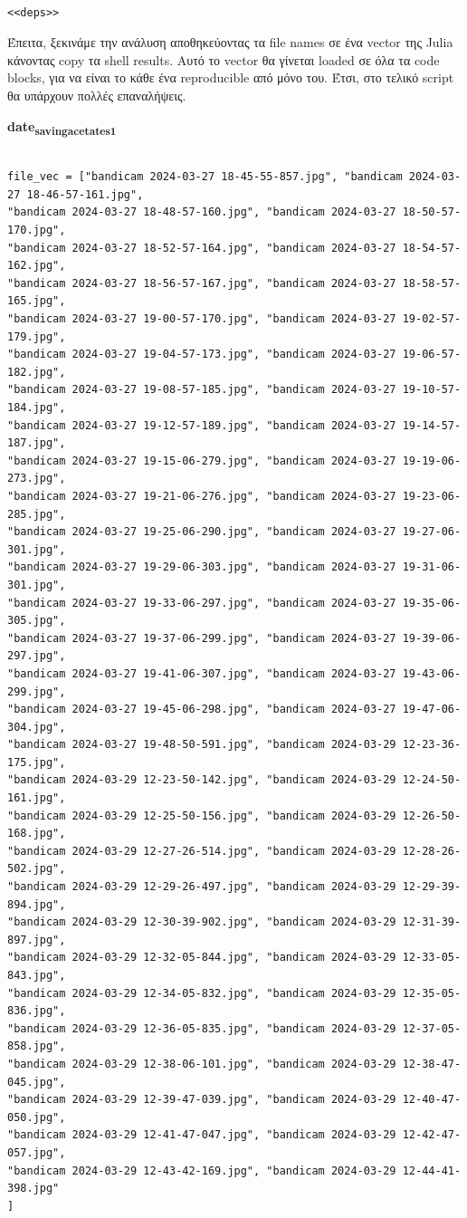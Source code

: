 \documentclass[11pt]{article}
\begin{document}
\begin{verbatim}

<<deps>>

\end{verbatim}

Έπειτα, ξεκινάμε την ανάλυση αποθηκεύοντας τα file names σε ένα vector της Julia κάνοντας copy τα shell results. Αυτό το vector θα γίνεται loaded σε όλα τα code blocks, για να είναι το κάθε ένα reproducible από μόνο του. Έτσι, στο τελικό script θα υπάρχουν πολλές επαναλήψεις.

\textbf{date\textsubscript{saving}\textsubscript{acetate}\textsubscript{s1}}
\begin{verbatim}

file_vec = ["bandicam 2024-03-27 18-45-55-857.jpg", "bandicam 2024-03-27 18-46-57-161.jpg",
"bandicam 2024-03-27 18-48-57-160.jpg", "bandicam 2024-03-27 18-50-57-170.jpg",
"bandicam 2024-03-27 18-52-57-164.jpg", "bandicam 2024-03-27 18-54-57-162.jpg",
"bandicam 2024-03-27 18-56-57-167.jpg", "bandicam 2024-03-27 18-58-57-165.jpg",
"bandicam 2024-03-27 19-00-57-170.jpg", "bandicam 2024-03-27 19-02-57-179.jpg",
"bandicam 2024-03-27 19-04-57-173.jpg", "bandicam 2024-03-27 19-06-57-182.jpg",
"bandicam 2024-03-27 19-08-57-185.jpg", "bandicam 2024-03-27 19-10-57-184.jpg",
"bandicam 2024-03-27 19-12-57-189.jpg", "bandicam 2024-03-27 19-14-57-187.jpg",
"bandicam 2024-03-27 19-15-06-279.jpg", "bandicam 2024-03-27 19-19-06-273.jpg",
"bandicam 2024-03-27 19-21-06-276.jpg", "bandicam 2024-03-27 19-23-06-285.jpg",
"bandicam 2024-03-27 19-25-06-290.jpg", "bandicam 2024-03-27 19-27-06-301.jpg",
"bandicam 2024-03-27 19-29-06-303.jpg", "bandicam 2024-03-27 19-31-06-301.jpg",
"bandicam 2024-03-27 19-33-06-297.jpg", "bandicam 2024-03-27 19-35-06-305.jpg",
"bandicam 2024-03-27 19-37-06-299.jpg", "bandicam 2024-03-27 19-39-06-297.jpg",
"bandicam 2024-03-27 19-41-06-307.jpg", "bandicam 2024-03-27 19-43-06-299.jpg",
"bandicam 2024-03-27 19-45-06-298.jpg", "bandicam 2024-03-27 19-47-06-304.jpg",
"bandicam 2024-03-27 19-48-50-591.jpg", "bandicam 2024-03-29 12-23-36-175.jpg",
"bandicam 2024-03-29 12-23-50-142.jpg", "bandicam 2024-03-29 12-24-50-161.jpg",
"bandicam 2024-03-29 12-25-50-156.jpg", "bandicam 2024-03-29 12-26-50-168.jpg",
"bandicam 2024-03-29 12-27-26-514.jpg", "bandicam 2024-03-29 12-28-26-502.jpg",
"bandicam 2024-03-29 12-29-26-497.jpg", "bandicam 2024-03-29 12-29-39-894.jpg",
"bandicam 2024-03-29 12-30-39-902.jpg", "bandicam 2024-03-29 12-31-39-897.jpg",
"bandicam 2024-03-29 12-32-05-844.jpg", "bandicam 2024-03-29 12-33-05-843.jpg",
"bandicam 2024-03-29 12-34-05-832.jpg", "bandicam 2024-03-29 12-35-05-836.jpg",
"bandicam 2024-03-29 12-36-05-835.jpg", "bandicam 2024-03-29 12-37-05-858.jpg",
"bandicam 2024-03-29 12-38-06-101.jpg", "bandicam 2024-03-29 12-38-47-045.jpg",
"bandicam 2024-03-29 12-39-47-039.jpg", "bandicam 2024-03-29 12-40-47-050.jpg",
"bandicam 2024-03-29 12-41-47-047.jpg", "bandicam 2024-03-29 12-42-47-057.jpg",
"bandicam 2024-03-29 12-43-42-169.jpg", "bandicam 2024-03-29 12-44-41-398.jpg"
]

\end{verbatim}
\end{document}
